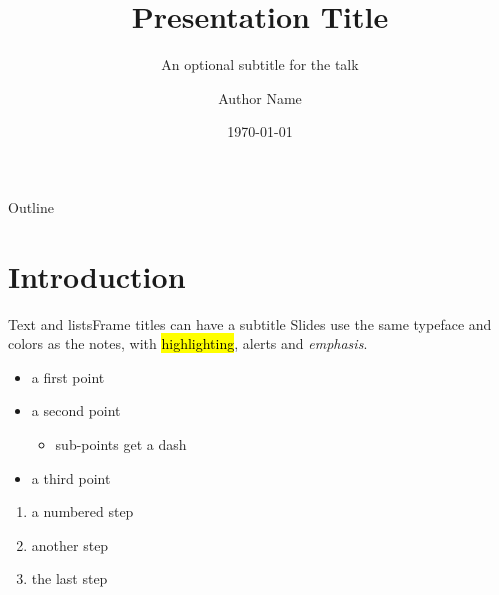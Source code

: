 \documentclass[aspectratio=169, 9pt, t, notheorems]{beamer}
\title[Short Title]{Presentation Title}   %
\subtitle{An optional subtitle for the talk}
\author{Author Name}
\institute{Department Name, University Name}
\date{\today}
\begin{document}
\titleframe   %

\begin{frame}{Outline}
  \tableofcontents
\end{frame}

\section{Introduction}     %

\begin{frame}{Text and lists}{Frame titles can have a subtitle}
  Slides use the same typeface and colors as the notes, with
  \hl{highlighting}, \alert{alerts} and \emph{emphasis}.
  \begin{itemize}
    \item a first point
    \item a second point
    \begin{itemize}
      \item sub-points get a dash
    \end{itemize}
    \item a third point
  \end{itemize}
  \begin{enumerate}
    \item a numbered step
    \item another step
    \item the last step
  \end{enumerate}
\end{frame}
\end{document}
